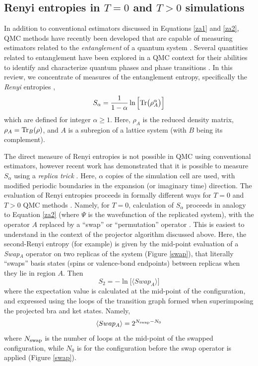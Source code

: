 \documentclass[range]{ar2e}
\begin{document}
\subsection{Renyi entropies in $T=0$ and $T>0$ simulations} 
\label{ss:renyi}


In addition to conventional estimators discussed in Equations \ref{za1} and \ref{za2}, QMC methods have recently been developed that are capable of measuring estimators related to the {\it entanglement} of a quantum system \cite{EntangleMeasure}.  Several quantities related to entanglement have been explored in a QMC context for their abilities to identify and characterize quantum phases and phase transitions
\cite{Tommaso1,Tommaso2,fluc1,fluc2,fid1,fid2}.  In this review, we concentrate of measures of the entanglement entropy, specifically the {\it Renyi} entropies \cite{renyi},
\begin{equation}
S_{\alpha} = \frac{1}{1-\alpha} \ln \Big[ {\rm Tr}\big( \rho_A^{\alpha} \big) \Big]
\end{equation}
which are defined for integer $\alpha \ge 1$.  Here, $\rho_A$ is the reduced density matrix, $\rho_A = {\rm Tr}_B (\rho)$, and $A$ is a subregion of a lattice system (with $B$ being its complement).  
 
The direct measure of Renyi entropies is not possible in QMC using conventional estimators, however recent work has demonstrated that it is possible to measure $S_{\alpha}$ using a {\it replica trick} \cite{Holz,Cardy, Fradkin, BP, Naka}.  Here, $\alpha$ copies of the simulation cell are used, with modified periodic boundaries in the expansion (or imaginary time) direction.  The evaluation of Renyi entropies proceeds in formally different ways for $T=0$ and $T>0$ QMC methods \cite{Hastings10,Melko10}.  Namely, for $T=0$, calculation of $S_{\alpha}$ proceeds in analogy to Equation \ref{za2} (where $\Psi$ is the wavefunction of the replicated system), with the operator $A$ replaced by a ``swap'' \cite{Hastings10} or ``permutation'' operator \cite{Kallin11}.
This is easiest to understand in the context of the projector algorithm discussed above.  Here, the second-Renyi entropy (for example) is given by the mid-point evaluation of a {\it Swap}$_A$ operator on two replicas of the system (Figure \ref{swap}), that literally ``swaps'' basis states (spins or valence-bond endpoints) between replicas when they lie in region $A$.  Then
\begin{equation}
 S_2 = -\ln \Big[ \langle Swap_A \rangle \Big]
\end{equation}
 where the expectation value is calculated at the mid-point of the configuration, and expressed using the loops of the transition graph formed when superimposing the projected bra and ket states.  Namely,
\begin{equation}
\langle Swap_A \rangle = 2^{N_{\rm swap} - N_{0}} 
\end{equation} 
where $N_{\rm swap}$ is the number of loops at the mid-point of the swapped configuration, while $N_0$ is for the configuration before the swap operator is applied (Figure \ref{swap}).  
\end{document}
